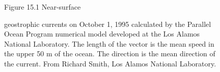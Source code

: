 \begin{figure}[t!]
   \footnotesize
  Figure 15.1 Near-surface \rule{0mm}{1ex}geostrophic
  currents
  on October 1, 1995 calculated by the Parallel Ocean Program
  numerical model developed at the Los Alamos National Laboratory. The
  length of the vector is the mean speed in the upper 50 m of the
  ocean. The direction is the mean direction of the current. From
  Richard Smith, Los Alamos National Laboratory.
\vspace{-4ex}
\label{fig:model_out}
\end{figure}

